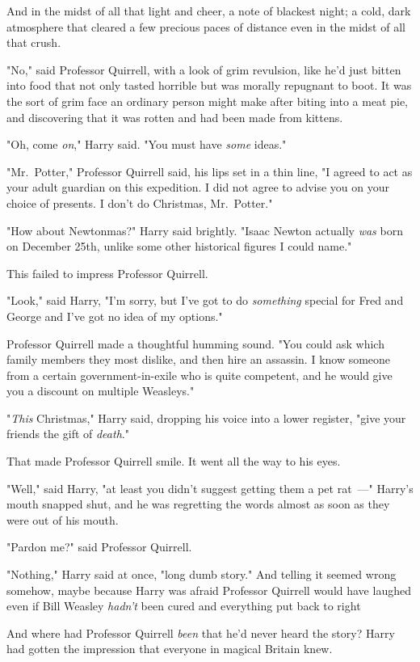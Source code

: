 And in the midst of all that light and cheer, a note of blackest night; a cold,
dark atmosphere that cleared a few precious paces of distance even in the midst
of all that crush.

"No," said Professor Quirrell, with a look of grim revulsion, like he'd just
bitten into food that not only tasted horrible but was morally repugnant to
boot. It was the sort of grim face an ordinary person might make after biting
into a meat pie, and discovering that it was rotten and had been made from
kittens.

"Oh, come \emph{on}," Harry said. "You must have \emph{some} ideas."

"Mr.~Potter," Professor Quirrell said, his lips set in a thin line, "I agreed
to act as your adult guardian on this expedition. I did not agree to advise you
on your choice of presents. I don't do Christmas, Mr.~Potter."

"How about Newtonmas?" Harry said brightly. "Isaac Newton actually \emph{was}
born on December 25th, unlike some other historical figures I could name."

This failed to impress Professor Quirrell.

"Look," said Harry, "I'm sorry, but I've got to do \emph{something} special for
Fred and George and I've got no idea of my options."

Professor Quirrell made a thoughtful humming sound. "You could ask which family
members they most dislike, and then hire an assassin. I know someone from a
certain government-in-exile who is quite competent, and he would give you a
discount on multiple Weasleys."

"\emph{This} Christmas," Harry said, dropping his voice into a lower register,
"give your friends the gift{\el} of \emph{death}."

That made Professor Quirrell smile. It went all the way to his eyes.

"Well," said Harry, "at least you didn't suggest getting them a pet rat~---"
Harry's mouth snapped shut, and he was regretting the words almost as soon as
they were out of his mouth.

"Pardon me?" said Professor Quirrell.

"Nothing," Harry said at once, "long dumb story." And telling it seemed wrong
somehow, maybe because Harry was afraid Professor Quirrell would have laughed
even if Bill Weasley \emph{hadn't} been cured and everything put back to
right{\el}

And where had Professor Quirrell \emph{been} that he'd never heard the story?
Harry had gotten the impression that everyone in magical Britain knew.

